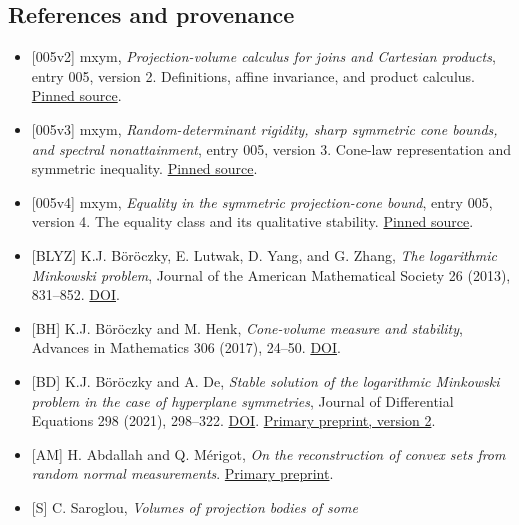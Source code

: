 \documentclass[
  11pt,
]{article}
\providecommand{\tightlist}{%
  \setlength{\itemsep}{0pt}\setlength{\parskip}{0pt}}
\begin{document}
\subsection{References and provenance}\label{references-and-provenance}

\begin{itemize}
\tightlist
\item
  {[}005v2{]} mxym, \emph{Projection-volume calculus for joins and
  Cartesian products}, entry 005, version 2. Definitions, affine
  invariance, and product calculus.
  \href{https://github.com/mxym/math/blob/6785c1c830f8e19e2eb07b0bb89f4d475a8b154a/preprints/005-simplex-product-optimum/v2/paper.md}{Pinned
  source}.
\item
  {[}005v3{]} mxym, \emph{Random-determinant rigidity, sharp symmetric
  cone bounds, and spectral nonattainment}, entry 005, version 3.
  Cone-law representation and symmetric inequality.
  \href{https://github.com/mxym/math/blob/6785c1c830f8e19e2eb07b0bb89f4d475a8b154a/preprints/005-simplex-product-optimum/v3/paper.md}{Pinned
  source}.
\item
  {[}005v4{]} mxym, \emph{Equality in the symmetric projection-cone
  bound}, entry 005, version 4. The equality class and its qualitative
  stability.
  \href{https://github.com/mxym/math/blob/6785c1c830f8e19e2eb07b0bb89f4d475a8b154a/preprints/005-simplex-product-optimum/v4/paper.md}{Pinned
  source}.
\item
  {[}BLYZ{]} K.J. Böröczky, E. Lutwak, D. Yang, and G. Zhang, \emph{The
  logarithmic Minkowski problem}, Journal of the American Mathematical
  Society 26 (2013), 831--852.
  \href{https://doi.org/10.1090/S0894-0347-2012-00741-3}{DOI}.
\item
  {[}BH{]} K.J. Böröczky and M. Henk, \emph{Cone-volume measure and
  stability}, Advances in Mathematics 306 (2017), 24--50.
  \href{https://doi.org/10.1016/j.aim.2016.10.005}{DOI}.
\item
  {[}BD{]} K.J. Böröczky and A. De, \emph{Stable solution of the
  logarithmic Minkowski problem in the case of hyperplane symmetries},
  Journal of Differential Equations 298 (2021), 298--322.
  \href{https://doi.org/10.1016/j.jde.2021.07.002}{DOI}.
  \href{https://arxiv.org/html/2101.03395v2}{Primary preprint, version
  2}.
\item
  {[}AM{]} H. Abdallah and Q. Mérigot, \emph{On the reconstruction of
  convex sets from random normal measurements}.
  \href{https://arxiv.org/abs/1402.5010}{Primary preprint}.
\item
  {[}S{]} C. Saroglou, \emph{Volumes of projection bodies of some
}
\end{itemize}
\end{document}

